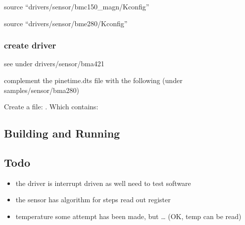 \documentclass[letterpaper,10pt,english]{sphinxmanual}
\begin{document}
source “drivers/sensor/bmc150\_magn/Kconfig”

source “drivers/sensor/bme280/Kconfig”


\subsubsection{create driver}
\label{\detokenize{drivers/bma421:create-driver}}
see under drivers/sensor/bma421

complement the pinetime.dts file with the following (under samples/sensor/bma280)

\begin{sphinxVerbatim}[commandchars=\\\{\}]
\end{sphinxVerbatim}

Create a file: .
Which contains:

\begin{sphinxVerbatim}[commandchars=\\\{\}]
 
 
        
        
\end{sphinxVerbatim}


\subsection{Building and Running}
\label{\detokenize{drivers/bma421:building-and-running}}

\subsection{Todo}
\label{\detokenize{drivers/bma421:todo}}\begin{itemize}
\item {} 
the driver is interrupt driven as well \textendash{} need to test software

\item {} 
the sensor has algorithm for steps \textendash{} read out register

\item {} 
temperature some attempt has been made, but … (OK, temp can be read)

\end{itemize}
\end{document}
